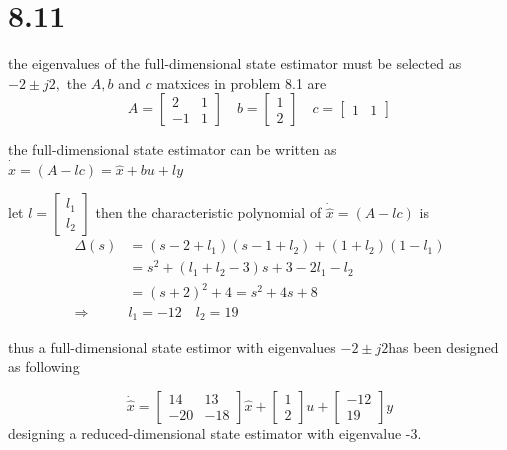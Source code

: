 \documentclass{article}
\begin{document}
\section*{8.11}

the eigenvalues of the full-dimensional state estimator must be selected as $-2 \pm j 2,$ the $A,b$
and $c$ matxices in problem 8.1 are
$$
A=\left[\begin{array}{cc}
2 & 1 \\
-1 & 1
\end{array}\right] \quad b=\left[\begin{array}{l}
1 \\
2
\end{array}\right] \quad c=\left[\begin{array}{ll}
1 & 1
\end{array}\right]
$$

the full-dimensional state estimator can be written as $\dot{\hat{x}}=(A-lc)=\hat{x}+bu+ly$

let $l=\left[\begin{array}{l}l_{1} \\ l_{2}\end{array}\right]$ then the characteristic polynomial of $\dot{\hat{x}}=(A-lc)$ is
$$
\begin{aligned}
\Delta(s) &=\left(s-2+l_{1}\right)\left(s-1+l_{2}\right)+\left(1+l_{2}\right)\left(1-l_{1}\right) \\
&=s^{2}+\left(l_{1}+l_{2}-3\right) s+3-2 l_{1}-l_{2} \\
&=(s+2)^{2}+4=s^{2}+4s+8 \\
\Rightarrow \quad & l_{1}=-12 \quad l_{2}=19
\end{aligned}
$$

thus a full-dimensional state estimor with eigenvalues $-2 \pm j 2$has been designed as following

$$
\dot{\hat{x}}=\left[\begin{array}{cc}
14 & 13 \\
-20 & -18
\end{array}\right] \hat{x}+\left[\begin{array}{l}
1 \\
2
\end{array}\right] u+\left[\begin{array}{c}
-12 \\
19
\end{array}\right] y
$$
designing a reduced-dimensional state estimator with eigenvalue -3.
\end{document}
